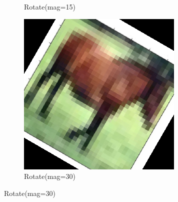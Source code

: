 \documentclass[onecolumn]{ujarticle}   %
\begin{document}
\begin{figure}[h]
\begin{subfigure}{0.3\columnwidth}
        \caption{Rotate(mag=15)}
        \label{fig:Rotate_15}
      \end{subfigure}
      \begin{subfigure}{0.3\columnwidth}
        \centering
        \includegraphics[width=1.0\columnwidth]{transform_test/Rotate_30.png}
        \caption{Rotate(mag=30)}
        \label{fig:Rotate_30}
      \end{subfigure}



\end{figure}
\end{document}
